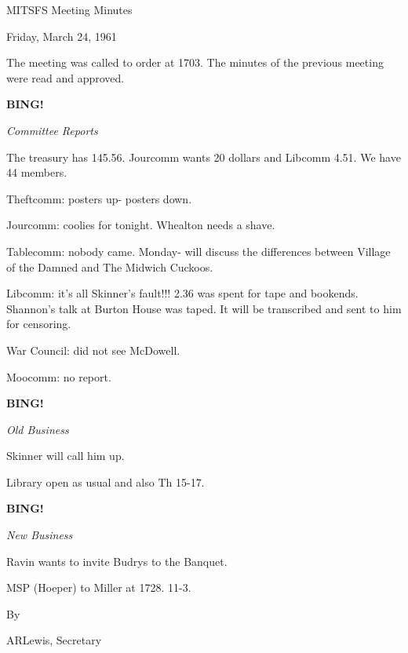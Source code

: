 \documentclass[12pt]{article}
\newcommand{\bing}{{\bf BING!} }
\newcommand{\goto}[1]{\bing \vskip 12pt \centerline{{\em{#1}}}}
\begin{document}
\begin{center}

MITSFS Meeting Minutes

Friday, March 24, 1961

\end{center}
 
\vspace{12pt}

\setlength{\parskip}{6pt}

\noindent
The meeting was called to order at 1703. The minutes of the previous meeting were read and approved.

\goto{Committee Reports}

The treasury has 145.56. Jourcomm wants 20 dollars and Libcomm 4.51. We have 44 members.

Theftcomm: posters up- posters down.

Jourcomm: coolies for tonight. Whealton needs a shave.

Tablecomm: nobody came. Monday- will discuss the differences between Village of the Damned and The Midwich Cuckoos.

Libcomm: it's all Skinner's fault!!! 2.36 was spent for tape and bookends. Shannon's talk at Burton House was taped. It will be transcribed and sent to him for censoring.

War Council: did not see McDowell.

Moocomm: no report.

\goto{Old Business}

Skinner will call him up.

Library open as usual and also Th 15-17.

\goto{New Business}

Ravin wants to invite Budrys to the Banquet.

MSP (Hoeper) to Miller at 1728. 11-3.

\vspace{12pt}

\centerline{By}
\centerline{ARLewis, Secretary}
\end{document}
